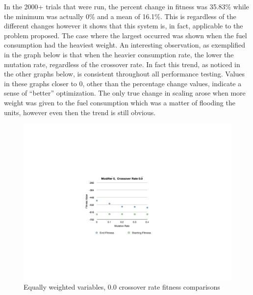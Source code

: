 In the 2000+ trials that were run, the percent change in fitness was 35.83\% while the minimum was actually 0\% and a mean of 16.1\%.  This is regardless of the different changes however it shows that this system is, in fact, applicable to the problem proposed.  The case where the largest occurred was shown when the fuel consumption had the heaviest weight.  An interesting observation, as exemplified in the graph below is that when the heavier consumption rate, the lower the mutation rate, regardless of the crossover rate.  In fact this trend, as noticed in the other graphs below, is consistent throughout all performance testing.  Values in these graphs closer to 0, other than the percentage change values, indicate a sense of ``better'' optimization.  The only true change in scaling arose when more weight was given to the fuel consumption which was a matter of flooding the units, however even then the trend is still obvious.
\vspace*{-2in}
\begin{figure}[h!]	
	\hspace*{-2in}\includegraphics[width=10in]{images/FitMute00.png}\hspace*{0in}\vspace*{-2in}
	\caption{Equally weighted variables, 0.0 crossover rate fitness comparisons}
	\label{Figure 1}
\end{figure}\vspace*{-4in}


